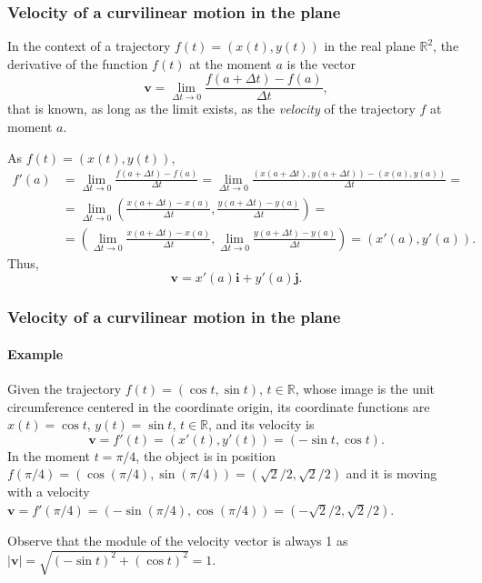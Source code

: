 \begin{frame}
\frametitle{Velocity of a curvilinear motion in the plane}
In the context of a trajectory $f(t)=(x(t),y(t))$ in the real plane $\mathbb{R}^2$, the derivative of the function $f(t)$ at the moment $a$ is the vector
\[
\mathbf{v} = \lim_{\Delta t\rightarrow 0} \frac{f(a+\Delta t)-f(a)}{\Delta t},
\]
that is known, as long as the limit exists, as the \emph{velocity} of the trajectory $f$ at moment $a$.

As $f(t)=(x(t),y(t))$,
\begin{align*}
f'(a)&=\lim_{\Delta t\rightarrow 0} \frac{f(a+\Delta t)-f(a)}{\Delta t} = \lim_{\Delta t\rightarrow 0} \frac{(x(a+\Delta t),y(a+\Delta t))-(x(a),y(a))}{\Delta t} =\\
&=  \lim_{\Delta t\rightarrow 0} \left(\frac{x(a+\Delta t)-x(a)}{\Delta t},\frac{y(a+\Delta t)-y(a)}{\Delta t}\right) =\\
&= \left(\lim_{\Delta t\rightarrow 0}\frac{x(a+\Delta t)-x(a)}{\Delta t},\lim_{\Delta t\rightarrow 0}\frac{y(a+\Delta t)-y(a)}{\Delta t}\right) = (x'(a),y'(a)).
\end{align*}
Thus, 
\[
\mathbf{v} = x'(a)\mathbf{i}+y'(a)\mathbf{j}.
\]
\end{frame}


\begin{frame}
\frametitle{Velocity of a curvilinear motion in the plane}
\framesubtitle{Example}
Given the trajectory $f(t) = (\cos t,\sin t)$, $t\in \mathbb{R}$, whose image is the unit circumference centered in the coordinate origin, its coordinate functions are $x(t) = \cos t$, $y(t) = \sin t$, $t\in \mathbb{R}$, and its velocity is
\[
\mathbf{v}=f'(t)=(x'(t),y'(t))=(-\sin t, \cos t).
\]
In the moment $t=\pi/4$, the object is in position $f(\pi/4) = (\cos(\pi/4),\sin(\pi/4)) =(\sqrt{2}/2,\sqrt{2}/2)$
and it is moving with a velocity $\mathbf{v}=f'(\pi/4)=(-\sin(\pi/4),\cos(\pi/4))=(-\sqrt{2}/2,\sqrt{2}/2)$.
\begin{center}
\end{center}
Observe that the module of the velocity vector is always 1 as
$|\mathbf{v}|=\sqrt{(-\sin t)^2+(\cos t)^2}=1$.
\end{frame}



